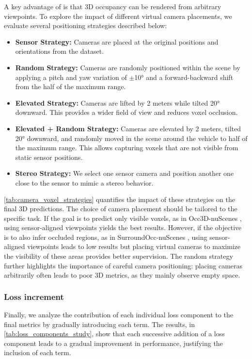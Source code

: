 A key advantage of \method{} is that {3D occupancy can be rendered} from arbitrary viewpoints. To explore the impact of different virtual camera placements, we evaluate several positioning strategies described below:

\begin{itemize}
    \item \textbf{Sensor Strategy:} Cameras are placed at the original positions and orientations from the dataset.
    \item \textbf{Random Strategy:} Cameras are randomly positioned within the scene by applying a pitch and yaw variation of $\pm$10° and a forward-backward shift from  the half of the maximum range.
    \item \textbf{Elevated Strategy:} Cameras are lifted by 2 meters while tilted 20° downward. This provides a wider field of view and reduces voxel occlusion.
    \item {\textbf{Elevated + Random Strategy:} Cameras are elevated by 2 meters, {tilted 20° downward,} and randomly moved in the scene around the vehicle to half of the maximum range. This allows capturing voxels that are not visible from static sensor positions.}
    \item \textbf{Stereo Strategy:} We select one sensor camera and position another one close to the sensor to mimic a stereo behavior.
\end{itemize}

\autoref{tab:camera_voxel_strategies} quantifies the impact of these strategies on the final 3D predictions. The choice of camera placement should be tailored to the specific task.
If the goal is to predict only visible voxels, as in Occ3D-nuScenes \cite{tian2023occ3d}, using sensor-aligned viewpoints yields the best results. However, if the objective is to also infer occluded regions, as in SurroundOcc-nuScenes \cite{wei2023surroundocc}, using sensor-aligned viewpoints leads to low results but placing virtual cameras to maximize the visibility of these areas provides better supervision. The random strategy further highlights the importance of careful camera positioning: placing cameras arbitrarily often leads to poor 3D metrics, as they mainly observe empty space.









\subsubsection{Loss increment}
Finally, we analyze the contribution of each individual loss component to the final metrics by gradually introducing each term. The results, in \autoref{tab:loss_components_study}, show that each successive addition of a loss component leads to a gradual improvement in performance, justifying the inclusion of each term.






